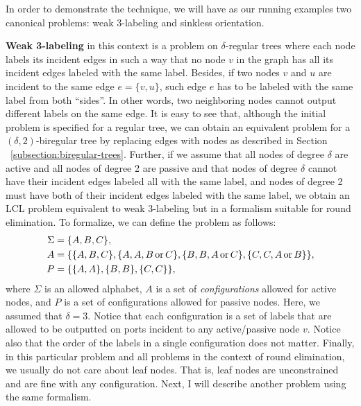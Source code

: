 In order to demonstrate the technique, we will have as our running
examples two canonical problems: weak 3-labeling and sinkless orientation.

\textbf{Weak 3-labeling} in this context is a problem on $\delta$-regular trees where
each node labels its incident edges in such a way that no node $v$ in the graph
has all its incident edges labeled with the same label. Besides, if two
nodes $v$ and $u$ are incident to the same edge $e = \{v, u\}$, such
edge $e$ has to be labeled with the same label from both ``sides''. In other words,
two neighboring nodes cannot output different labels on the same edge.
It is easy to see that, although the initial problem is specified for a regular
tree, we can obtain an equivalent problem for a $(\delta, 2)$-biregular tree
by replacing edges with nodes as described in Section ~\ref{subsection:biregular-trees}.
Further, if we assume that all nodes of degree $\delta$ are active and all nodes of 
degree 2 are passive and that nodes of degree $\delta$ cannot have their incident
edges labeled all with the same label, and nodes of degree 2 must have both of their
incident edges labeled with the same label, we obtain an LCL problem equivalent to
weak 3-labeling but in a formalism suitable for round elimination. To formalize, we
can define the problem as follows:
\begin{align*}
\Sigma &= \{A, B, C\}, \\
A &= \{ \{A, B, C\}, \{A, A, B \operatorname{or} C\}, \{B, B, A \operatorname{or} C\}, \{C, C, A \operatorname{or} B\} \}, \\
P &= \{ \{A, A\}, \{B, B\}, \{C, C\}\},
\end{align*}
where $\Sigma$ is an allowed alphabet, $A$ is a set of \emph{configurations}
allowed for active nodes, and $P$ is a set of configurations allowed for
passive nodes. Here, we assumed that $\delta = 3$. Notice that each
configuration is a set of labels that are allowed to be outputted on ports
incident to any active/passive node $v$. Notice also that the order of
the labels in a single configuration does not matter. Finally, in this particular problem
and all problems in the context of round elimination, we usually do not care about
leaf nodes. That is, leaf nodes are unconstrained and are fine with any 
configuration. Next, I will
describe another problem using the same formalism.

